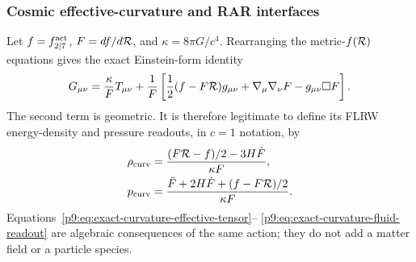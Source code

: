 \documentclass[12pt,a4paper]{article}
\begin{document}
\subsubsection{Cosmic effective-curvature and RAR interfaces}
\label{p9:sec:scalaron-phenomenology-interfaces}
Let \(f=f_{2\mid7}^{\rm act}\), \(F=df/d\mathcal R\), and
\(\kappa=8\pi G/c^4\).  Rearranging the metric-\(f(\mathcal R)\) equations gives
the exact Einstein-form identity
\begin{equation}
\label{p9:eq:exact-curvature-effective-tensor}
G_{\mu\nu}=\frac{\kappa}{F}T_{\mu\nu}
+\frac1F\left[
 \frac12(f-F\mathcal R)g_{\mu\nu}
 +\nabla_\mu\nabla_\nu F-g_{\mu\nu}\Box F
\right].
\end{equation}
The second term is geometric.  It is therefore legitimate to define its
FLRW energy-density and pressure readouts, in \(c=1\) notation, by
\begin{align}
\label{p9:eq:exact-curvature-fluid-readout}
\rho_{\rm curv}
 &=\frac{(F\mathcal R-f)/2-3H\dot F}{\kappa F},\\
p_{\rm curv}
 &=\frac{\ddot F+2H\dot F+(f-F\mathcal R)/2}{\kappa F}.
\end{align}
Equations~\eqref{p9:eq:exact-curvature-effective-tensor}--
\eqref{p9:eq:exact-curvature-fluid-readout} are algebraic consequences of
the same action; they do not add a matter field or a particle species.
\end{document}
